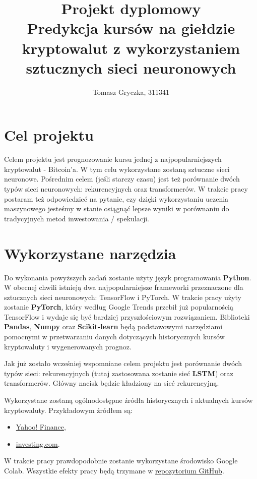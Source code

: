 \documentclass[a4paper,11pt]{article}
\title{Projekt dyplomowy \\ Predykcja kursów na giełdzie kryptowalut z wykorzystaniem sztucznych sieci neuronowych}
\author{Tomasz Gryczka, 311341}
\begin{document}
\maketitle

\section{Cel projektu}
Celem projektu jest prognozowanie kursu jednej z najpopularniejszych kryptowalut - Bitcoin'a. W tym celu wykorzystane zostaną sztuczne sieci neuronowe. Pośrednim celem (jeśli starczy czasu) jest też porównanie dwóch typów sieci neuronowych: rekurencyjnych oraz transformerów. W trakcie pracy postaram też odpowiedzieć na pytanie, czy dzięki wykorzystaniu uczenia maszynowego jesteśmy w stanie osiągnąć lepsze wyniki w porównaniu do tradycyjnych metod inwestowania / spekulacji.
\section{Wykorzystane narzędzia}
Do wykonania powyższych zadań zostanie użyty język programowania \textbf{Python}. W obecnej chwili istnieją dwa najpopularniejsze frameworki przeznaczone dla sztucznych sieci neuronowych: TensorFlow i PyTorch. W trakcie pracy użyty zostanie \textbf{PyTorch}, który według Google Trends przebił już popularnością TensorFlow i wydaje się być bardziej przyszłościowym rozwiązaniem. Biblioteki \textbf{Pandas}, \textbf{Numpy} oraz \textbf{Scikit-learn} będą podstawowymi narzędziami pomocnymi w przetwarzaniu danych dotyczących historycznych kursów kryptowaluty i wygenerowanych prognoz.

Jak już zostało wcześniej wspomniane celem projektu jest porównanie dwóch typów sieci: rekurencyjnych (tutaj zastosowana zostanie sieć \textbf{LSTM}) oraz transformerów. Główny nacisk będzie kładziony na sieć rekurencyjną.

Wykorzystane zostaną ogólnodostępne źródła historycznych i aktualnych kursów kryptowaluty. Przykładowym źródłem są:
\begin{itemize}
  \item \href{https://finance.yahoo.com/quote/BTC-USD/history?period1=1410912000&period2=1679961600&interval=1d&filter=history&frequency=1d&includeAdjustedClose=true}{Yahoo! Finance},
  \item \href{https://www.investing.com/crypto/bitcoin/historical-data}{investing.com}.
\end{itemize}

W trakcie pracy prawdopodobnie zostanie wykorzystane środowisko Google Colab. Wszystkie efekty pracy będą trzymane w \href{https://github.com/TomaszGryczka/CryptoPredictor}{repozytorium GitHub}.
\end{document}
